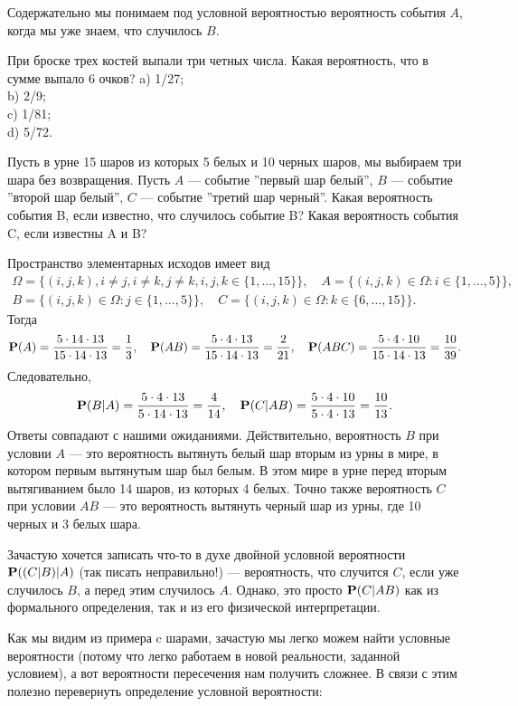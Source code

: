 \documentclass[11 pt,russian]{article}
\begin{document}
Содержательно мы понимаем под условной вероятностью вероятность события $A$, когда мы уже знаем, что случилось $B$.
\begin{Que}
При броске трех костей выпали три четных числа. Какая вероятность, что в сумме выпало 6 очков?
a) 1/27;\\
b) 2/9;\\
c) 1/81;\\
d) 5/72.
\end{Que}
\begin{Exam}
Пусть в урне 15 шаров из которых 5 белых и 10 черных шаров, мы выбираем три шара без возвращения. Пусть $A$ --- событие ''первый шар белый'', $B$ --- событие ''второй шар белый'', $C$ --- событие ''третий шар черный''. Какая вероятность события B, если известно, что случилось событие B? Какая вероятность события C, если известны A и B?

Пространство элементарных исходов имеет вид 
\begin{eqnarray*}
\Omega = \{(i,j,k), i\neq j, i\neq k, j\neq k, i,j,k\in \{1,\dotsc,15\}\}, \quad
A = \{(i,j,k)\in \Omega: i\in \{1,\dotsc,5\}\}, \\
B = \{(i,j,k)\in \Omega: j\in \{1,\dotsc,5\}\}, \quad
C = \{(i,j,k)\in \Omega: k\in \{6,\dotsc,15\}\}.
\end{eqnarray*}
Тогда
$$
{\bf P}(A) = \frac{5\cdot 14\cdot 13}{15\cdot 14\cdot 13} = \frac13,\quad {\bf P}(AB) = \frac{5\cdot 4\cdot 13}{15\cdot 14\cdot 13} = \frac{2}{21},\quad {\bf P}(ABC) = \frac{5\cdot 4\cdot 10}{15 \cdot 14 \cdot 13} = \frac{10}{39}.
$$
Следовательно,
$$
{\bf P}(B|A) = \frac{5\cdot 4\cdot 13}{5\cdot 14 \cdot 13} = \frac{4}{14},\quad
{\bf P}(C|AB) = \frac{5 \cdot 4 \cdot 10}{5\cdot 4\cdot 13} = \frac{10}{13}.
$$
Ответы совпадают с нашими ожиданиями. Действительно, вероятность $B$ при условии $A$ --- это вероятность вытянуть белый шар вторым из урны в мире, в котором первым вытянутым шар был белым. В этом мире в урне перед вторым вытягиванием было 14 шаров, из которых 4 белых. Точно также вероятность $C$ при условии $AB$ --- это вероятность вытянуть черный шар из урны, где 10 черных и 3 белых шара. 

Зачастую хочется записать что-то в духе двойной условной вероятности ${\bf P}((C|B)|A)$ (так писать неправильно!)  --- вероятность, что случится $C$, если уже случилось $B$, а перед этим случилось $A$. Однако, это просто ${\bf P}(C|AB)$ как из формального определения, так и из его физической интерпретации.
\end{Exam}
Как мы видим из примера c шарами, зачастую мы легко можем найти условные вероятности (потому что легко работаем в новой реальности, заданной условием), а вот вероятности пересечения нам получить сложнее. В связи с этим полезно перевернуть определение условной вероятности:
\end{document}
